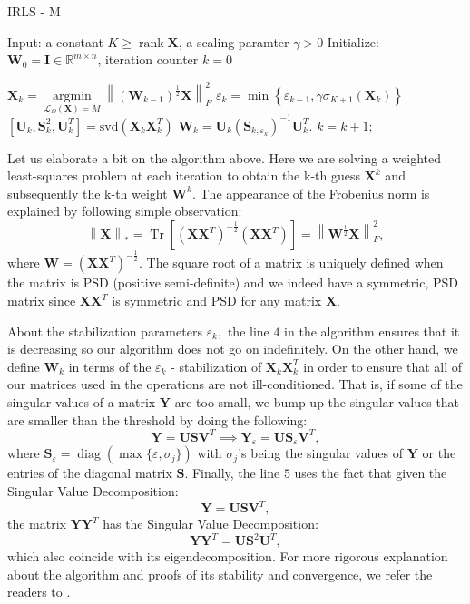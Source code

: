 \documentclass[12pt]{article}
\def\bU{\boldsymbol{U}}
\def \bX{\boldsymbol{X}}
\def \bY{\boldsymbol{Y}}
\def \bV{\boldsymbol{V}}
\def \bS{\boldsymbol{S}}
\def \bW{\boldsymbol{W}}
\def \bI{\boldsymbol{I}}
\newcommand{\norm}[1]{\left\|#1\right\|}
\DeclareMathOperator{\rank}{rank}
\DeclareMathOperator{\argmin}{argmin}
\DeclareMathOperator{\Tr}{Tr}
\DeclareMathOperator{\diag}{diag}
\begin{document}
\begin{algorithm}
\caption{IRLS - M}
\begin{algorithmic}[1]
\State Input: a constant $K \geq \rank{\bX}$, a scaling paramter $\gamma > 0$
\State Initialize: $\bW_0 = \bI\in\mathbb{R}^{m\times n}$, iteration counter $k = 0$

\State $\bX_k =\underset{\mathcal{L}_\Omega(\bX)=M}{\argmin} \norm {(\bW_{k-1})^\frac 12 \bX}_F^2$
\State $\varepsilon_k = \min\left\{{\varepsilon_{k-1}, \gamma\sigma_{K+1}(\bX_k)}\right\}$
\State $[\bU_k, \bS_k^2, \bU_k^T]=\text{svd}(\bX_k\bX_k^T)$
\State $\bW_k = \bU_k(\bS_{k,\varepsilon_k})^{-1}\bU_k^T.$
\State $k = k+1;$
\EndWhile
\end{algorithmic}
\end{algorithm}
\newpage
Let us elaborate a bit on the algorithm above. Here we are solving a weighted least-squares problem at each iteration to obtain the k-th guess $\bX^k$ and subsequently the k-th weight $\bW^k.$ The appearance of the Frobenius norm is explained by following simple observation:
\[\norm{\bX}_* = \Tr[(\bX\bX^T)^{-\frac 12}(\bX\bX^T)] = \norm{\bW^{\frac 12}\bX}_F^2,\]
where $\bW = (\bX\bX^T)^{-\frac 12}$. 
The square root of a matrix is uniquely defined when the matrix is PSD (positive semi-definite)  and we indeed have a symmetric, PSD matrix since $\bX\bX^T$ is symmetric and PSD for any matrix $\bX.$ 

About the stabilization parameters $\varepsilon_k,$ the line $4$ in the algorithm ensures that it is decreasing so our algorithm does not go on indefinitely. On the other hand, we define $\bW_k$ in terms of the $\varepsilon_k$ - stabilization of $\bX_k\bX_k^T$ in order to ensure that all of our matrices used in the operations are not ill-conditioned. That is, if some of the singular values of a matrix $\bY$ are too small,  we bump up the singular values that are smaller than the threshold by doing the following:
\[\bY =\bU\bS\bV^T\implies \bY_\varepsilon = \bU\bS_{\varepsilon}\bV^T, \]
where $\bS_\varepsilon = \diag(\max\{\varepsilon, \sigma_j\})$ with $\sigma_j$'s being the singular values of $\bY$ or the entries of the diagonal matrix $\bS.$ Finally, the line $5$ uses the fact that given the Singular Value Decomposition:
\[\bY = \bU\bS\bV^T,\]
the matrix $\bY\bY^T$ has the Singular Value Decomposition:
\[\bY\bY^T = \bU\bS^2\bU^T,\]
which also coincide with its eigendecomposition. For more rigorous explanation about the algorithm and proofs of its stability and convergence, we refer the readers to \cite{IRLS- arxiv}.
\end{document}
